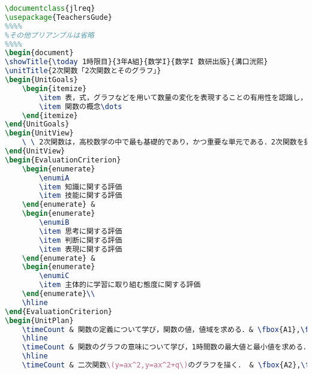 \documentclass[paper=a4,fontsize=10.5pt]{jlreq}
\begin{document}
\begin{lstlisting}[language=TeX]
\documentclass{jlreq}
\usepackage{TeachersGude}
%%%%
%その他プリアンブルは省略
%%%%
\begin{document}
\showTitle{\today 1時限目}{3年A組}{数学I}{数学I 数研出版}{溝口洸熙}
\unitTitle{2次関数「2次関数とそのグラフ」}
\begin{UnitGoals}
    \begin{itemize}
        \item 表，式，グラフなどを用いて数量の変化を表現することの有用性を認識し，関数の考えを具体的な事象の考察に活用しようとする．
        \item 関数の概念\dots
    \end{itemize}
\end{UnitGoals}
\begin{UnitView}
    \ \ 2次関数は，高校数学の中で最も基礎的であり，かつ重要な単元である．2次関数を扱い，関数概念の理解を深め，関数を用いて数量の変化を表現することの有用性を認識できるよう\dots
\end{UnitView}
\begin{EvaluationCriterion}
    \begin{enumerate}
        \enumiA
        \item 知識に関する評価
        \item 技能に関する評価
    \end{enumerate} &
    \begin{enumerate}
        \enumiB
        \item 思考に関する評価
        \item 判断に関する評価
        \item 表現に関する評価
    \end{enumerate} &
    \begin{enumerate}
        \enumiC
        \item 主体的に学習に取り組む態度に関する評価
    \end{enumerate}\\
    \hline
\end{EvaluationCriterion}
\begin{UnitPlan}
    \timeCount & 関数の定義について学び，関数の値，値域を求める．& \fbox{A1},\fbox{B2} & 観察・小テスト・自己評価\\
    \hline
    \timeCount & 関数のグラフの意味について学び，1時間数の最大値と最小値を求める．& \fbox{B1},\fbox{B2} & 観察・ワークシート\\
    \hline
    \timeCount & 二次関数\(y=ax^2,y=ax^2+q\)のグラフを描く． & \fbox{A2},\fbox{B1} & 観察・ワークシート・自己評価\\

\end{lstlisting}
\end{document}

